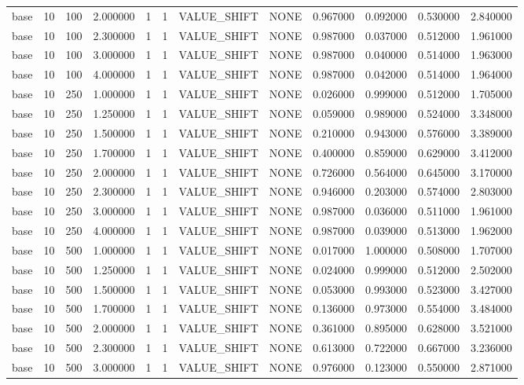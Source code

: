 \begin{tabular}{lrrrllllrrrr}
base & 10 & 100 & 2.000000 & 1 & 1 & VALUE_SHIFT & NONE & 0.967000 & 0.092000 & 0.530000 & 2.840000 \\
base & 10 & 100 & 2.300000 & 1 & 1 & VALUE_SHIFT & NONE & 0.987000 & 0.037000 & 0.512000 & 1.961000 \\
base & 10 & 100 & 3.000000 & 1 & 1 & VALUE_SHIFT & NONE & 0.987000 & 0.040000 & 0.514000 & 1.963000 \\
base & 10 & 100 & 4.000000 & 1 & 1 & VALUE_SHIFT & NONE & 0.987000 & 0.042000 & 0.514000 & 1.964000 \\
base & 10 & 250 & 1.000000 & 1 & 1 & VALUE_SHIFT & NONE & 0.026000 & 0.999000 & 0.512000 & 1.705000 \\
base & 10 & 250 & 1.250000 & 1 & 1 & VALUE_SHIFT & NONE & 0.059000 & 0.989000 & 0.524000 & 3.348000 \\
base & 10 & 250 & 1.500000 & 1 & 1 & VALUE_SHIFT & NONE & 0.210000 & 0.943000 & 0.576000 & 3.389000 \\
base & 10 & 250 & 1.700000 & 1 & 1 & VALUE_SHIFT & NONE & 0.400000 & 0.859000 & 0.629000 & 3.412000 \\
base & 10 & 250 & 2.000000 & 1 & 1 & VALUE_SHIFT & NONE & 0.726000 & 0.564000 & 0.645000 & 3.170000 \\
base & 10 & 250 & 2.300000 & 1 & 1 & VALUE_SHIFT & NONE & 0.946000 & 0.203000 & 0.574000 & 2.803000 \\
base & 10 & 250 & 3.000000 & 1 & 1 & VALUE_SHIFT & NONE & 0.987000 & 0.036000 & 0.511000 & 1.961000 \\
base & 10 & 250 & 4.000000 & 1 & 1 & VALUE_SHIFT & NONE & 0.987000 & 0.039000 & 0.513000 & 1.962000 \\
base & 10 & 500 & 1.000000 & 1 & 1 & VALUE_SHIFT & NONE & 0.017000 & 1.000000 & 0.508000 & 1.707000 \\
base & 10 & 500 & 1.250000 & 1 & 1 & VALUE_SHIFT & NONE & 0.024000 & 0.999000 & 0.512000 & 2.502000 \\
base & 10 & 500 & 1.500000 & 1 & 1 & VALUE_SHIFT & NONE & 0.053000 & 0.993000 & 0.523000 & 3.427000 \\
base & 10 & 500 & 1.700000 & 1 & 1 & VALUE_SHIFT & NONE & 0.136000 & 0.973000 & 0.554000 & 3.484000 \\
base & 10 & 500 & 2.000000 & 1 & 1 & VALUE_SHIFT & NONE & 0.361000 & 0.895000 & 0.628000 & 3.521000 \\
base & 10 & 500 & 2.300000 & 1 & 1 & VALUE_SHIFT & NONE & 0.613000 & 0.722000 & 0.667000 & 3.236000 \\
base & 10 & 500 & 3.000000 & 1 & 1 & VALUE_SHIFT & NONE & 0.976000 & 0.123000 & 0.550000 & 2.871000 \\

\end{tabular}
